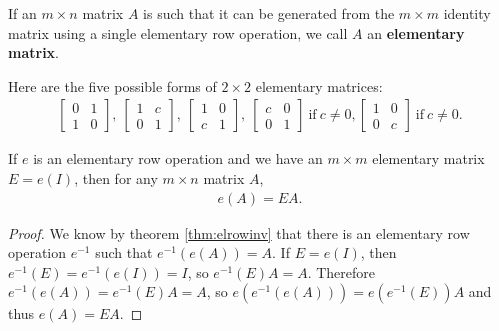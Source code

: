 \documentclass[12pt]{article}
\begin{document}
\begin{defn}
  If an $m \times n$ matrix $A$ is such that it can be generated
  from the $m \times m$ identity matrix using a single elementary
  row operation, we call $A$ an \textbf{elementary matrix}.

  \begin{exm}
    Here are the five possible forms of $2 \times 2$ elementary
    matrices:
    \begin{align*}
      \begin{bmatrix}
        0 & 1\\
        1 & 0
      \end{bmatrix},\
      \begin{bmatrix}
        1 & c\\
        0 & 1
      \end{bmatrix},\
      \begin{bmatrix}
        1 & 0\\
        c & 1
      \end{bmatrix},\
      \begin{bmatrix}
        c & 0\\
        0 & 1
      \end{bmatrix}\ \text{if}\ c \neq 0,
      \begin{bmatrix}
        1 & 0\\
        0 & c
      \end{bmatrix}\ \text{if}\ c \neq 0.
    \end{align*}
  \end{exm}
\end{defn}

\begin{thm} \label{thm:elrowelmat}
  If $e$ is an elementary row operation and we have an $m \times
  m$ elementary matrix $E = e(I)$, then for any $m \times n$
  matrix $A$,
  \begin{align*}
    e(A) = EA.
  \end{align*}
  \begin{proof}
    We know by theorem \ref{thm:elrowinv} that there is an
    elementary row operation $e^{-1}$ such that $e^{-1}(e(A)) =
    A$. If $E = e(I)$, then $e^{-1}(E) = e^{-1}(e(I)) = I$, so
    $e^{-1}(E)A = A$. Therefore $e^{-1}(e(A)) = e^{-1}(E)A = A$,
    so $e(e^{-1}(e(A))) = e(e^{-1}(E))A$ and thus $e(A) = EA$.
  \end{proof}
\end{thm}
\end{document}
